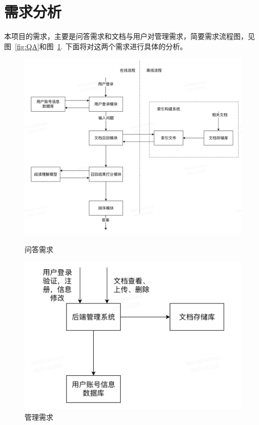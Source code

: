 \documentclass[12pt]{article}
\begin{document}
\section{需求分析}  %

本项目的需求，主要是问答需求和文档与用户对管理需求，简要需求流程图，见图~\ref{fig:QA}和图~\ref{fig:Manage}. 下面将对这两个需求进行具体的分析。

\begin{figure}[H]
	\begin{minipage}[t]{0.5\textwidth}
		\centering
		\includegraphics[scale=0.4]{fig/QA.png}
		\caption{问答需求\label{fig:QA}}
	\end{minipage}
	\qquad
	\begin{minipage}[t]{0.5\textwidth}
		\centering
		\includegraphics[scale=0.4]{fig/Manage.png}
		\caption{管理需求\label{fig:Manage}}
	\end{minipage}
\end{figure}
\end{document}
